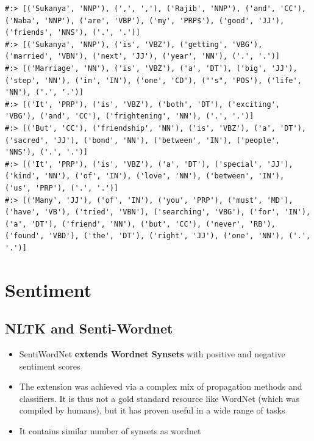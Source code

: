 \documentclass[
]{book}
\providecommand{\tightlist}{%
  \setlength{\itemsep}{0pt}\setlength{\parskip}{0pt}}
\begin{document}
\begin{verbatim}
#:> [('Sukanya', 'NNP'), (',', ','), ('Rajib', 'NNP'), ('and', 'CC'), ('Naba', 'NNP'), ('are', 'VBP'), ('my', 'PRP$'), ('good', 'JJ'), ('friends', 'NNS'), ('.', '.')]
#:> [('Sukanya', 'NNP'), ('is', 'VBZ'), ('getting', 'VBG'), ('married', 'VBN'), ('next', 'JJ'), ('year', 'NN'), ('.', '.')]
#:> [('Marriage', 'NN'), ('is', 'VBZ'), ('a', 'DT'), ('big', 'JJ'), ('step', 'NN'), ('in', 'IN'), ('one', 'CD'), ("'s", 'POS'), ('life', 'NN'), ('.', '.')]
#:> [('It', 'PRP'), ('is', 'VBZ'), ('both', 'DT'), ('exciting', 'VBG'), ('and', 'CC'), ('frightening', 'NN'), ('.', '.')]
#:> [('But', 'CC'), ('friendship', 'NN'), ('is', 'VBZ'), ('a', 'DT'), ('sacred', 'JJ'), ('bond', 'NN'), ('between', 'IN'), ('people', 'NNS'), ('.', '.')]
#:> [('It', 'PRP'), ('is', 'VBZ'), ('a', 'DT'), ('special', 'JJ'), ('kind', 'NN'), ('of', 'IN'), ('love', 'NN'), ('between', 'IN'), ('us', 'PRP'), ('.', '.')]
#:> [('Many', 'JJ'), ('of', 'IN'), ('you', 'PRP'), ('must', 'MD'), ('have', 'VB'), ('tried', 'VBN'), ('searching', 'VBG'), ('for', 'IN'), ('a', 'DT'), ('friend', 'NN'), ('but', 'CC'), ('never', 'RB'), ('found', 'VBD'), ('the', 'DT'), ('right', 'JJ'), ('one', 'NN'), ('.', '.')]
\end{verbatim}

\hypertarget{sentiment}{%
\section{Sentiment}\label{sentiment}}

\hypertarget{nltk-and-senti-wordnet}{%
\subsection{NLTK and Senti-Wordnet}\label{nltk-and-senti-wordnet}}

\begin{itemize}
\tightlist
\item
  SentiWordNet \textbf{extends Wordnet Synsets} with positive and negative sentiment scores\\
\item
  The extension was achieved via a complex mix of propagation methods and classifiers. It is thus not a gold standard resource like WordNet (which was compiled by humans), but it has proven useful in a wide range of tasks\\
\item
  It contains similar number of synsets as wordnet
\end{itemize}
\end{document}
